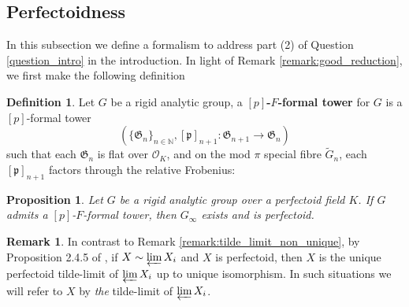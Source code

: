 \documentclass[10pt,oneside]{amsart}
\newtheorem{proposition}[theorem]{Proposition}
\theoremstyle{definition}
\newtheorem{definition}[theorem]{Definition}
\newtheorem{remark}[theorem]{Remark}
\begin{document}
	
	
	
	\subsection{Perfectoidness}  \label{subsection:perfectoid_tilde_limit}

In this subsection we define a formalism to address part (2) of Question \ref{question_intro} in the introduction. In light of Remark \ref{remark:good_reduction}, we first make the following definition
	
	\begin{definition}
		Let $G$ be a rigid analytic group, a \textbf{$[p]$-$F$-formal tower} for $G$ is a $[p]$-formal tower 
		$$(\{\mathfrak G_n\}_{n\in \mathbb N}, [\mathfrak p]_{n+1}:\mathfrak G_{n+1}\rightarrow \mathfrak G_{n})$$ such that each $\mathfrak G_n$ is flat over $\mathcal O_K$, and on the mod $\pi$ special fibre  $\tilde{G}_n$, each   $[\mathfrak p]_{n+1}$ factors through the relative Frobenius:
				\begin{center}
				\end{center}
	 
	\end{definition}	
	
	 	\begin{proposition}\label{existence of p-F-formal tower implies perfectoid}
		Let $G$ be a rigid analytic group over a perfectoid field $K$. If $G$ admits a $[p]$-$F$-formal tower, then $G_\infty$ exists and is perfectoid. 
	\end{proposition}
	 
	\begin{remark} \label{remark:tilde_limit_unique}
In contrast to Remark \ref{remark:tilde_limit_non_unique}, by Proposition 2.4.5 of \cite{SW}, if $X \sim \varprojlim X_i$ and $X$ is perfectoid, then $X$ is the unique perfectoid tilde-limit of $ \varprojlim X_i$ up to unique isomorphism. In such situations we will refer to $X$ by \textit{the} tilde-limit of $ \varprojlim X_i$. 
	\end{remark} 
	 
\end{document}
